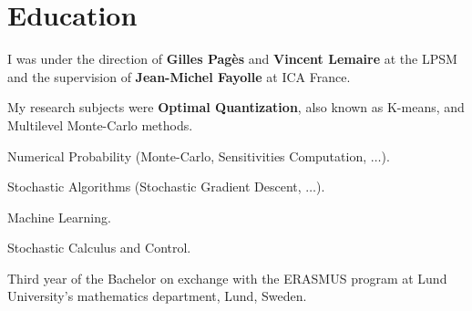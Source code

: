 \documentclass[]{deedy-resume-openfont}
\begin{document}

\vspace{\topsep}

\section{Education}

I was under the direction of \textbf{Gilles Pagès} and \textbf{Vincent Lemaire} at the LPSM and the supervision of \textbf{Jean-Michel Fayolle} at ICA France.

My research subjects were \textbf{Optimal Quantization}, also known as K-means, and Multilevel Monte-Carlo methods.

\sectionsep

\vspace{0.1cm}
\begin{tightemize}
	\item[\diamond] Numerical Probability (Monte-Carlo, Sensitivities Computation, $\dots$).
	\item[\diamond] Stochastic Algorithms (Stochastic Gradient Descent, $\dots$).
	\item[\diamond] Machine Learning.
	\item[\diamond] Stochastic Calculus and Control.
\end{tightemize}

\sectionsep

Third year of the Bachelor on exchange with the ERASMUS program at Lund University's mathematics department, Lund, Sweden.
\end{document}

